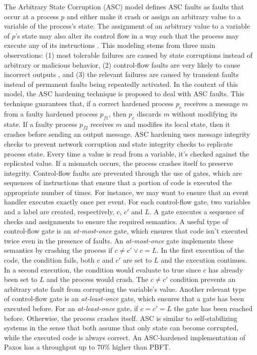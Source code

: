 \documentclass[runningheads,a4paper]{llncs}
\begin{document}
The Arbitrary State Corruption (ASC) model defines ASC faults as faults that occur at a process $p$ and either make it crash or assign an arbitrary value to a variable of the process's state. The assignment of an arbitrary value to a variable of $p$'s state may also alter its control flow in a way such that the process may execute any of its instructions \cite{Correia2012}. This modeling stems from three main observations: (1) most tolerable failures are caused by state corruptions instead of arbitrary or malicious behavior, (2) control-flow faults are very likely to cause incorrect outputs \cite{Kalbarczyk2003}, and (3) the relevant failures are caused by transient faults instead of permanent faults being repeatedly activated. In the context of this model, the ASC hardening technique is proposed to deal with ASC faults. This technique guarantees that, if a correct hardened process $p_c$ receives a message $m$ from a faulty hardened process $p_{f1}$, then $p_c$ discards $m$ without modifying its state. If a faulty process $p_{f2}$ receives $m$ and modifies its local state, then it crashes before sending an output message. ASC hardening uses message integrity checks to prevent network corruption and state integrity checks to replicate process state. Every time a value is read from a variable, it's checked against the replicated value. If a mismatch occurs, the process crashes itself to preserve integrity. Control-flow faults are prevented through the use of gates, which are sequences of instructions that ensure that a portion of code is executed the appropriate number of times. For instance, we may want to ensure that an event handler executes exactly once per event. For each control-flow gate, two variables and a label are created, respectively, $c$, $c'$ and $L$. A gate executes a sequence of checks and assignments to ensure the required semantics. A useful type of control-flow gate is an \textit{at-most-once} gate, which ensures that code isn't executed twice even in the presence of faults. An \textit{at-most-once} gate implements these semantics by crashing the process if $c \neq c' \vee c=L$. In the first execution of the code, the condition fails, both $c$ and $c'$ are set to $L$ and the execution continues. In a second execution, the condition would evaluate to true since $c$ has already been set to $L$ and the process would crash. The $c \neq c'$ condition prevents an arbitrary state fault from corrupting the variable's value. Another relevant type of control-flow gate is an \textit{at-least-once} gate, which ensures that a gate has been executed before. For an \textit{at-least-once} gate, if $c=c'=L$ the gate has been reached before. Otherwise, the process crashes itself. ASC is similar to self-stabilizing systems \cite{Dijkstra1974} in the sense that both assume that only state can become corrupted, while the executed code is always correct. An ASC-hardened implementation of Paxos has a throughput up to 70\% higher than PBFT. \par
\end{document}
